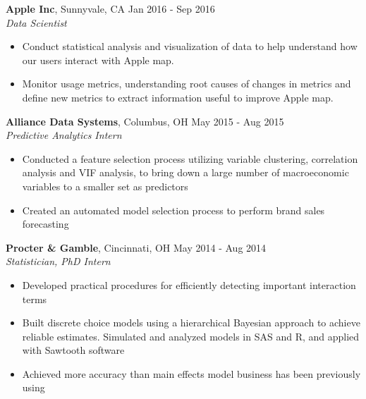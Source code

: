 \documentclass[10pt]{res} %
\begin{document}
\begin{resume}
{\bf Apple Inc}, Sunnyvale, CA \hfill Jan 2016 - Sep 2016\\
 {\sl Data Scientist}
 \begin{itemize} \itemsep -2pt
\item Conduct statistical analysis and visualization of data to help understand how our users interact with Apple map.
\item Monitor usage metrics, understanding root causes of changes in metrics and define new metrics to extract information useful to improve Apple map.
 \end{itemize}

\vspace{6pt} %
 {\bf Alliance Data Systems}, Columbus, OH \hfill May 2015 - Aug 2015\\
 {\sl Predictive Analytics Intern}
 \begin{itemize} \itemsep -2pt
\item Conducted a feature selection process utilizing variable clustering,
   correlation analysis and VIF analysis, to bring down a large number
   of macroeconomic variables to a smaller set as predictors
\item Created an automated model selection process to perform brand sales forecasting

 \end{itemize}

 {\bf Procter \& Gamble}, Cincinnati, OH  \hfill May 2014 - Aug 2014\\
 {\sl Statistician, PhD Intern}
 \begin{itemize} \itemsep -2pt  %
 \item Developed practical procedures for efficiently detecting important
   interaction terms
 \item Built discrete choice models using a hierarchical Bayesian approach to achieve reliable estimates. Simulated and analyzed models in SAS and R, and applied with Sawtooth software
\item Achieved more accuracy than main effects model business has been
  previously using
 \end{itemize}




\end{resume}
\end{document}
